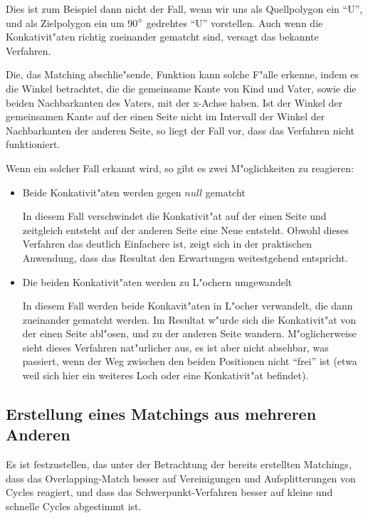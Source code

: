 Dies ist zum Beispiel dann nicht der Fall, wenn wir uns als Quellpolygon ein "`U"', und als Zielpolygon ein um 90$\degree$ gedrehtes "`U"' vorstellen. Auch wenn die Konkativit"aten richtig zueinander gematcht sind, versagt das bekannte Verfahren.

Die, das Matching abschlie"sende, Funktion kann solche F"alle erkenne, indem es die Winkel betrachtet, die die gemeinsame Kante von Kind und Vater, sowie die beiden Nachbarkanten des Vaters, mit der x-Achse haben. Ist der Winkel der gemeinsamen Kante auf der einen Seite nicht im  Intervall der Winkel der Nachbarkanten der anderen Seite, so liegt der Fall vor, dass das Verfahren nicht funktioniert.

Wenn ein solcher Fall erkannt wird, so gibt es zwei M"oglichkeiten zu reagieren:
\begin{itemize}
\item Beide Konkativit"aten werden gegen $null$ gematcht

In diesem Fall verschwindet die Konkativit"at auf der einen Seite  und zeitgleich entsteht auf der anderen Seite eine Neue entsteht. Obwohl dieses Verfahren das deutlich Einfachere ist, zeigt sich in der praktischen Anwendung, dass das Resultat den Erwartungen weitestgehend entspricht.

\item Die beiden Konkativit"aten werden zu L"ochern umgewandelt

In diesem Fall werden beide Konkavit"aten in L"ocher verwandelt, die dann zueinander gematcht werden. Im Resultat w"urde sich die Konkativit"at von der einen Seite abl"osen, und zu der anderen Seite wandern. M"oglicherweise sieht dieses Verfahren nat"urlicher aus, es ist aber nicht absehbar, was passiert, wenn der Weg zwischen den beiden Positionen nicht "`frei"' ist (etwa weil sich hier ein weiteres Loch oder eine Konkativit"at befindet).

\end{itemize}


\subsection{Erstellung eines Matchings aus mehreren Anderen}


Es ist festzustellen, das unter der Betrachtung der bereits erstellten Matchings, dass das Overlapping-Match besser auf Vereinigungen und Aufsplitterungen von Cycles reagiert, und dass das Schwerpunkt-Verfahren besser auf kleine und schnelle Cycles abgestimmt ist. 

